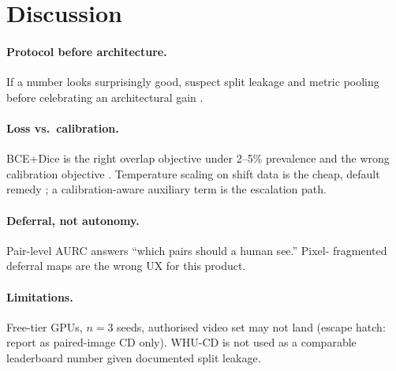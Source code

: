 \section{Discussion}
\label{sec:discussion}

\paragraph{Protocol before architecture.}
If a number looks surprisingly good, suspect split leakage and metric
pooling before celebrating an architectural gain
\cite{corley_2024_reality}.

\paragraph{Loss vs.\ calibration.}
BCE+Dice is the right overlap objective under 2--5\% prevalence and
the wrong calibration objective \cite{mehrtash_2020_calibration}.
Temperature scaling on shift data is the cheap, default remedy
\cite{ovadia_2019_shift}; a calibration-aware auxiliary term is the
escalation path.

\paragraph{Deferral, not autonomy.}
Pair-level AURC answers ``which pairs should a human see.'' Pixel-
fragmented deferral maps are the wrong UX for this product.

\paragraph{Limitations.}
Free-tier GPUs, $n=3$ seeds, authorised video set may not land
(escape hatch: report as paired-image CD only). WHU-CD is not used as
a comparable leaderboard number given documented split leakage.
